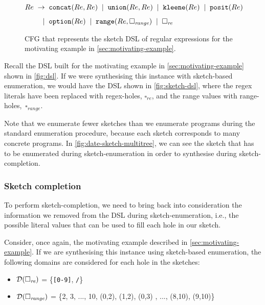 \begin{figure}[t]
  \begin{align*}
    Re \;\to \;\;&  \texttt{concat}(Re, Re) \;\;|\;\;  \texttt{union}(Re, Re)   \;\;|\;\;  \texttt{kleene}(Re) \;\;|\;\;  \texttt{posit}(Re) \\[1.1ex]
          |\;\;&  \texttt{option}(Re) \;\;|\;\;  \texttt{range}(Re, \square_{\textit{range}}) \;\;|\;\; \square_{\textit{re}}
  \end{align*}
  \caption{\ac{CFG} that represents the sketch \ac{DSL} of regular expressions for the motivating example in \autoref{sec:motivating-example}. }
  \label{fig:sketch-dsl}
\end{figure}

\begin{example}
Recall the DSL built for the motivating example in \autoref{sec:motivating-example} shown in \autoref{fig:dsl}. If we were synthesising this instance with sketch-based enumeration, we would have the DSL shown in \autoref{fig:sketch-dsl}, where the regex literals have been replaced with regex-holes, \(\square_{\textit{re}}\), and the range values with range-holes,~\(\square_{\textit{range}}\).
\end{example}

\noindent
Note that we enumerate fewer sketches than we enumerate programs during the standard enumeration procedure, because each sketch corresponds to many concrete programs. In \autoref{fig:date-sketch-multitree}, we can see the sketch that has to be enumerated during sketch-enumeration in order to synthesise  during sketch-completion.



\subsubsection{Sketch completion}

To perform sketch-completion, we need to bring back into consideration the information we removed from the \ac{DSL} during sketch-enumeration, i.e., the possible literal values that can be used to fill each hole in our sketch.

\begin{example}
Consider, once again, the motivating example described in \autoref{sec:motivating-example}. If we are synthesising this instance using sketch-based enumeration, the following domains are considered for each hole in the sketches:
\begin{itemize}
    \item \({\mathcal{D}}(\square_{\textit{re}})\) = \{\texttt{[0-9]}, \texttt{/}\}
    \item \({\mathcal{D}}(\square_{\textit{range}})\) = \{2, 3, ..., 10, (0,2), (1,2), (0,3) , ..., (8,10), (9,10)\}
\end{itemize}
\end{example}

